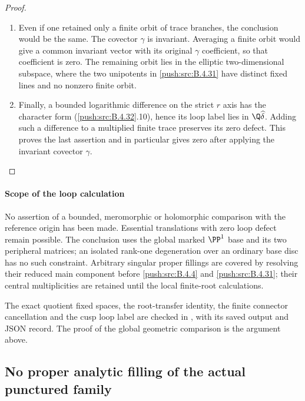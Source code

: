 \begin{proof}
\begin{enumerate}[label=\arabic*.,leftmargin=*]
\item Even if one retained only a finite orbit of trace branches,
the conclusion would be the same. The covector $\gamma$
is invariant. Averaging a finite orbit would give a common
invariant vector with its original $\gamma$ coefficient,
so that coefficient is zero. The remaining orbit lies in
the elliptic two-dimensional subspace, where the two
unipotents in \ref{push:src:B.4.31} have distinct fixed lines and no
nonzero finite orbit.

\item Finally, a bounded logarithmic difference on the strict
$r$ axis has the character form (\ref{push:src:B.4.32}.10), hence its
loop label lies in $\Q\widehat\delta$. Adding such a
difference to a multiplied finite trace preserves its
zero defect. This proves the last assertion and in
particular gives zero after applying the invariant
covector $\gamma$.
\end{enumerate}
\end{proof}


\paragraph{Scope of the loop calculation}
No assertion of a bounded, meromorphic or holomorphic
comparison with the reference origin has been made.
Essential translations with zero loop defect remain
possible. The conclusion uses the global marked
$\PP^1$ base and its two peripheral matrices; an isolated
rank-one degeneration over an ordinary base disc has
no such constraint. Arbitrary singular proper fillings
are covered by resolving their reduced main component
before \ref{push:src:B.4.4} and \ref{push:src:B.4.31}; their central multiplicities
are retained until the local finite-root calculations.




The exact quotient fixed spaces, the root-transfer identity,
the finite connector cancellation and the cusp loop label
are checked in
, with its saved
output and JSON record. The proof of the global geometric
comparison is the argument above.

\subsection{No proper analytic filling of the actual punctured family}


